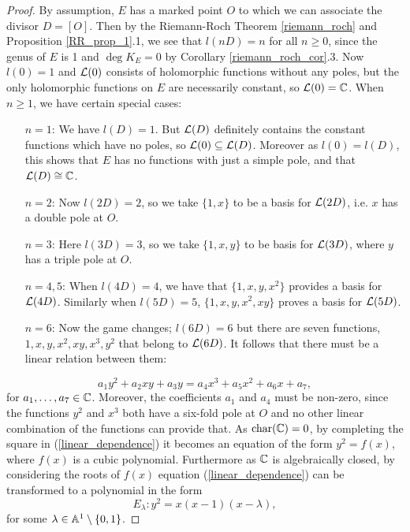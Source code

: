 \begin{proof}
	By assumption, $E$ has a marked point $O$ to which we can associate the divisor $D = [O]$. Then by the Riemann-Roch Theorem \ref{riemann_roch} and Proposition \ref{RR_prop_1}.1, we see that $l(nD) = n$ for all $n \geq 0$, since the genus of $E$ is 1 and $\deg K_{E} = 0$ by Corollary \ref{riemann_roch_cor}.3. Now $l(0) = 1$ and $\mathcal{L}(0)$ consists of holomorphic functions without any poles, but the only holomorphic functions on $E$ are necessarily constant, so  $\mathcal{L}(0) = \mathbb{C}$. When $n\geq 1$, we have certain special cases:
	\begin{enumerate}
		\item[$n=1$:] We have $l(D) = 1$. But $\mathcal{L}(D)$ definitely contains the constant functions which have no poles, so $\mathcal{L}(0) \subseteq \mathcal{L}(D)$. Moreover as $l(0) = l(D)$, this shows that $E$ has no functions with just a simple pole, and that $\mathcal{L}(D) \cong \mathbb{C}$.
		\item [$n=2$:] Now $l(2D) = 2$, so we take $\{1,x\}$ to be a basis for $\mathcal{L}(2D)$, i.e. $x$ has a double pole at $O$.
		\item [$n = 3$:] Here $l(3D) = 3$, so we take $\{1,x,y\}$ to be basis for $\mathcal{L}(3D)$, where $y$ has a triple pole at $O$.
		\item [$n = 4,5$:]  When $l(4D) = 4$, we have that $\{1, x, y, x^{2}\}$ provides a basis for $\mathcal{L}(4D)$. Similarly when $l(5D) = 5$, $\{1, x, y, x^{2}, xy\}$ proves a basis for $\mathcal{L}(5D)$.
		\item [$n = 6$:] Now the game changes; $l(6D) = 6$ but there are seven functions, $1, x, y, x^{2}, xy, x^{3}, y^{2}$ that belong to $\mathcal{L}(6D)$. It follows that there must be a linear relation between them:
	\end{enumerate}
	\begin{equation}
	\label{linear_dependence}
		a_{1}y^{2} + a_{2}xy + a_{3}y = a_{4}x^{3} + a_{5}x^{2} + a_{6}x + a_{7},
	\end{equation}
	for $a_{1}, \ldots, a_{7} \in \mathbb{C}$. Moreover, the coefficients $a_{1}$ and $a_{4}$ must be non-zero, since the functions $y^{2}$ and $x^{3}$ both have a six-fold pole at $O$ and no other linear combination of the functions can provide that. As $\operatorname{char}(\mathbb{C}) = 0$, by completing the square in (\ref{linear_dependence}) it becomes an equation of the form $y^{2} = f(x)$, where $f(x)$ is a cubic polynomial. Furthermore as $\mathbb{C}$ is algebraically closed, by considering the roots of $f(x)$ equation (\ref{linear_dependence}) can be transformed to a polynomial in the form
	\begin{equation*}
		E_{\lambda}: y^{2} = x(x-1)(x-\lambda),
	\end{equation*}
	for some $\lambda \in \mathbb{A}^{1}\setminus\{0,1\}$.
\end{proof}

